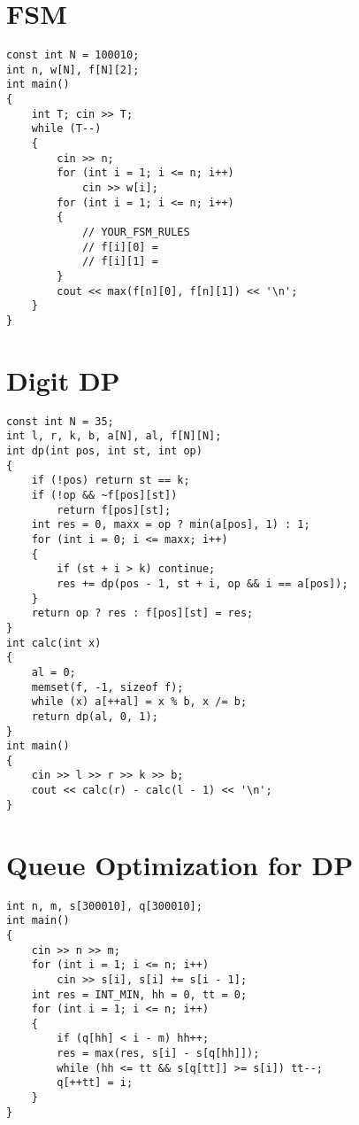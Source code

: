 \section{FSM}
\begin{lstlisting}
const int N = 100010;
int n, w[N], f[N][2];
int main()
{
    int T; cin >> T;
    while (T--)
    {
        cin >> n;
        for (int i = 1; i <= n; i++)
            cin >> w[i];
        for (int i = 1; i <= n; i++)
        {
            // YOUR_FSM_RULES
            // f[i][0] =
            // f[i][1] =
        }
        cout << max(f[n][0], f[n][1]) << '\n';
    }
}
\end{lstlisting}
\section{Digit DP}
\begin{lstlisting}
const int N = 35;
int l, r, k, b, a[N], al, f[N][N];
int dp(int pos, int st, int op)
{
    if (!pos) return st == k;
    if (!op && ~f[pos][st])
        return f[pos][st];
    int res = 0, maxx = op ? min(a[pos], 1) : 1;
    for (int i = 0; i <= maxx; i++)
    {
        if (st + i > k) continue;
        res += dp(pos - 1, st + i, op && i == a[pos]);
    }
    return op ? res : f[pos][st] = res;
}
int calc(int x)
{
    al = 0;
    memset(f, -1, sizeof f);
    while (x) a[++al] = x % b, x /= b;
    return dp(al, 0, 1);
}
int main()
{
    cin >> l >> r >> k >> b;
    cout << calc(r) - calc(l - 1) << '\n';
}
\end{lstlisting}
\section{Queue Optimization for DP}
\begin{lstlisting}
int n, m, s[300010], q[300010];
int main()
{
    cin >> n >> m;
    for (int i = 1; i <= n; i++)
        cin >> s[i], s[i] += s[i - 1];
    int res = INT_MIN, hh = 0, tt = 0;
    for (int i = 1; i <= n; i++)
    {
        if (q[hh] < i - m) hh++;
        res = max(res, s[i] - s[q[hh]]);
        while (hh <= tt && s[q[tt]] >= s[i]) tt--;
        q[++tt] = i;
    }
}
\end{lstlisting}